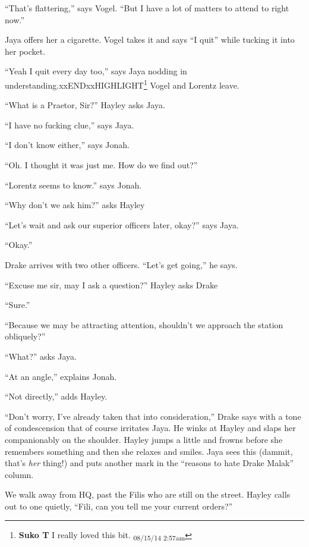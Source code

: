 ``That's flattering,'' says Vogel.  ``But I have a lot of matters to attend to right now.''  

Jaya offers her a cigarette.  Vogel takes it and says ``I quit'' while tucking it into her pocket.

``Yeah I quit every day too,'' says Jaya nodding in understanding.xxENDxxHIGHLIGHT\footnote{\textbf{Suko T }I really loved this bit. \textsubscript{08/15/14 2:57am}}
Vogel and Lorentz leave.



``What is a Praetor, Sir?'' Hayley asks Jaya.

``I have no fucking clue,'' says Jaya.

``I don't know either,'' says Jonah.

``Oh.  I thought it was just me.  How do we find out?''

``Lorentz seems to know.'' says Jonah.

``Why don't we ask him?'' asks Hayley

``Let's wait and ask our superior officers later, okay?'' says Jaya.

``Okay.''



Drake arrives with two other officers.  ``Let's get going,'' he says.

``Excuse me sir, may I ask a question?'' Hayley asks Drake

``Sure.''

``Because we may be attracting attention, shouldn't we approach the station obliquely?'' 

``What?'' asks Jaya.

``At an angle,'' explains Jonah.

``Not directly,'' adds Hayley.

``Don't worry, I've already taken that into consideration,'' Drake says with a tone of condescension that of course irritates Jaya.  He winks at Hayley and slaps her companionably on the shoulder.  Hayley jumps a little and frowns before she remembers something and then she relaxes and smiles.  Jaya sees this (dammit, that's \textit{her} thing!) and puts another mark in the ``reasons to hate Drake Malak'' column.  





We walk away from HQ, past the Filis who are still on the street.  Hayley calls out to one quietly, ``Fili, can you tell me your current orders?''


